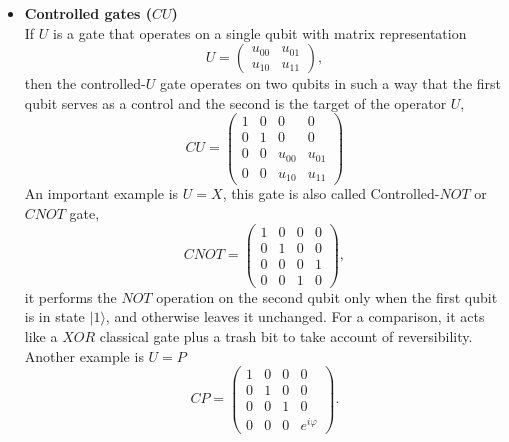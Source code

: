 \begin{itemize}
    \item \textbf{Controlled gates ($CU$)} \\
    If $U$ is a gate that operates on a single qubit with matrix representation
    \begin{equation}
        U = \left( \begin{array}{cc} u_{00} & u_{01} \\
                                     u_{10} & u_{11} \end{array} \right),
    \end{equation}
    then the controlled-$U$ gate operates on two qubits in such a way that the first qubit serves as a control and the second is the target of the operator $U$,
    \begin{equation}
        CU = \left( \begin{array}{cccc} 1 & 0 & 0 & 0 \\
                                        0 & 1 & 0 & 0 \\
                                        0 & 0 & u_{00} & u_{01} \\
                                        0 & 0 & u_{10} & u_{11} \end{array} \right)
    \end{equation}
    An important example is $U = X$, this gate is also called Controlled-$NOT$ or $CNOT$ gate,
    \begin{equation}
        CNOT = \left( \begin{array}{cccc} 1 & 0 & 0 & 0 \\
                                          0 & 1 & 0 & 0 \\
                                          0 & 0 & 0 & 1 \\
                                          0 & 0 & 1 & 0 \end{array} \right),
    \end{equation}
    it performs the $NOT$ operation on the second qubit only when the first qubit is in state $|1\rangle$, and otherwise leaves it unchanged. For a comparison, it acts like a $XOR$ classical gate plus a trash bit to take account of reversibility. \\
    Another example is $U = P$
    \begin{equation}
        CP = \left( \begin{array}{cccc} 1 & 0 & 0 & 0 \\
                                        0 & 1 & 0 & 0 \\
                                        0 & 0 & 1 & 0 \\
                                        0 & 0 & 0 & e^{i\varphi} \end{array} \right).
    \end{equation}
    

\end{itemize}
